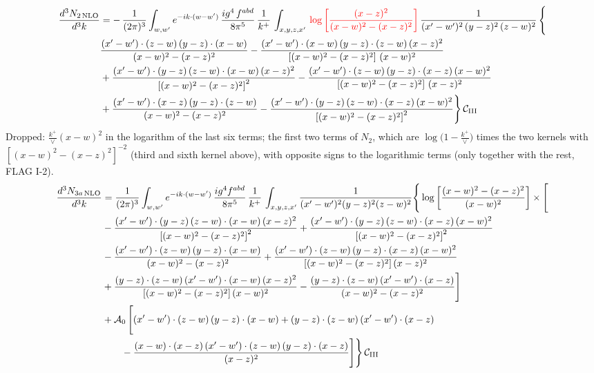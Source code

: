 \documentclass[9pt]{article}
\numberwithin{equation}{section}
\begin{document}
\begin{align}
   \frac{d^{3}N_{2\,\rm NLO}}{d^{3}k}  & =  -\,\frac{1}{(2\pi)^{3}}  \int_{w, w^\prime} e^{-ik\cdot(w-w^\prime)}\, \frac{ig^{4}\, f^{abd}}{8\pi^{5}}\, \frac{1}{k^{+}}\, \int_{x,y,z,x'}\,{\color{red}\log{\left[\frac{(x-z)^{2}}{(x-w)^{2}-(x-z)^{2}}\right]}}\,\frac{1}{(x'-w')^{2}\, (y-z)^{2}\, (z-w)^{2}}\,\Bigg\{\notag \\
&  \frac{(x'-w')\cdot (z-w)\, (y-z)\cdot (x-w)}{(x-w)^{2}-(x-z)^{2}}
 -\frac{(x'-w')\cdot (x-w)\, (y-z)\cdot(z-w)\,(x-z)^{2}}{\left[(x-w)^{2}-(x-z)^{2}\right]\,(x-w)^{2}}\notag \\
& +\frac{(x'-w')\cdot  (y-z)\, (z-w)\cdot (x-w)\, (x-z)^{2}}{\left[(x-w)^{2}-(x-z)^{2}\right]^{2}}
 - \frac{(x'-w')\cdot (z-w)\, (y-z)\cdot (x-z)\, (x-w)^{2}}{\left[(x-w)^{2} - (x-z)^{2}\right]\, (x-z)^{2}}\notag \\
& +\frac{(x'-w')\cdot (x-z)\, (y-z)\cdot (z-w)}{(x-w)^{2} -(x-z)^{2}}
 -\frac{(x'-w')\cdot (y-z)\, (z-w)\cdot (x-z)\,(x-w)^{2}}{\left[(x-w)^{2}-(x-z)^{2}\right]^{2}}\Bigg\}\,\mathcal{C}_{\rm III}
\end{align}
{\color{orange}Dropped: $\frac{k^{+}}{\vee}(x-w)^{2}$ in the logarithm of the last six terms; the first two terms of $N_{2}$, which are $\log\big(1-\frac{k^{+}}{\vee}\big)$ times the two kernels with $[(x-w)^{2}-(x-z)^{2}]^{-2}$ (third and sixth kernel above), with opposite signs to the logarithmic terms (only together with the rest, FLAG I-2).}
\begin{align}
\frac{d^{3}N_{3a\,\rm NLO}}{d^{3}k} & = \frac{1}{(2\pi)^{3}}\int_{w,w'}e^{-ik\cdot(w-w')}\,\frac{ig^{4}f^{abd}}{8\pi^{5}}\,\frac{1}{k^{+}}\,\int_{x,y,z,x'}\frac{1}{(x'-w')^{2}(y-z)^{2}(z-w)^{2}}\Bigg\{\log{\left[\frac{(x-w)^{2}-(x-z)^{2}}{(x-w)^{2}}\right]}\times\Bigg[\notag \\
& -\frac{(x'-w')\cdot(y-z)\,(z-w)\cdot(x-w)\,(x-z)^{2}}{\left[(x-w)^{2}-(x-z)^{2}\right]^{2}}
 +\frac{(x'-w')\cdot(y-z)\,(z-w)\cdot(x-z)\,(x-w)^{2}}{\left[(x-w)^{2}-(x-z)^{2}\right]^{2}}\notag \\
& -\frac{(x'-w')\cdot(z-w)\,(y-z)\cdot(x-w)}{(x-w)^{2}-(x-z)^{2}}
 +\frac{(x'-w')\cdot(z-w)\,(y-z)\cdot(x-z)\,(x-w)^{2}}{\left[(x-w)^{2}-(x-z)^{2}\right](x-z)^{2}}\notag \\
& +\frac{(y-z)\cdot(z-w)\,(x'-w')\cdot(x-w)\,(x-z)^{2}}{\left[(x-w)^{2}-(x-z)^{2}\right](x-w)^{2}}
 -\frac{(y-z)\cdot(z-w)\,(x'-w')\cdot(x-z)}{(x-w)^{2}-(x-z)^{2}}\Bigg]\notag \\
& +\mathcal{A}_{0}\,\Bigg[(x'-w')\cdot(z-w)\,(y-z)\cdot(x-w)+(y-z)\cdot(z-w)\,(x'-w')\cdot(x-z)\notag\\
&\qquad -\frac{(x-w)\cdot(x-z)\,(x'-w')\cdot(z-w)\,(y-z)\cdot(x-z)}{(x-z)^{2}}\Bigg]\Bigg\}\,\mathcal{C}_{\rm III}
\end{align}
\end{document}
